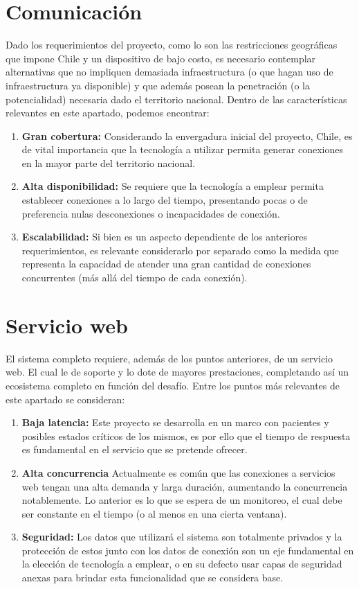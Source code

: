 \newpage
\section{Comunicación}
Dado los requerimientos del proyecto, como lo son las restricciones geográficas que impone Chile y un dispositivo de bajo costo, es necesario contemplar alternativas que no impliquen demasiada infraestructura (o que hagan uso de infraestructura ya disponible) y que además posean la penetración (o la potencialidad) necesaria dado el territorio nacional. Dentro de las características relevantes en este apartado, podemos encontrar:

\begin{enumerate}
	\item \textbf{Gran cobertura:}
	Considerando la envergadura inicial del proyecto, Chile, es de vital importancia que la tecnología a utilizar permita generar conexiones en la mayor parte del territorio nacional.
	\item \textbf{Alta disponibilidad:}
	Se requiere que la tecnología a emplear permita establecer conexiones a lo largo del tiempo, presentando pocas o de preferencia nulas desconexiones o incapacidades de conexión.
	\item \textbf{Escalabilidad:}
	Si bien es un aspecto dependiente de los anteriores requerimientos, es relevante considerarlo por separado como la medida que representa la capacidad de atender una gran cantidad de conexiones concurrentes (más allá del tiempo de cada conexión).
\end{enumerate}

\newpage
\section{Servicio web}
El sistema completo requiere, además de los puntos anteriores, de un servicio web. El cual le de soporte y lo dote de mayores prestaciones, completando así un ecosistema completo en función del desafío. Entre los puntos más relevantes de este apartado se consideran:

\begin{enumerate}
	\item \textbf{Baja latencia:}
	Este proyecto se desarrolla en un marco con pacientes y posibles estados críticos de los mismos, es por ello que el tiempo de respuesta es fundamental en el servicio que se pretende ofrecer.
	\item \textbf{Alta concurrencia}
	Actualmente es común que las conexiones a servicios web tengan una alta demanda y larga duración, aumentando la concurrencia notablemente. Lo anterior es lo que se espera de un monitoreo, el cual debe ser constante en el tiempo (o al menos en una cierta ventana).
	\item \textbf{Seguridad:}
	Los datos que utilizará el sistema son totalmente privados y la protección de estos junto con los datos de conexión son un eje fundamental en la elección de tecnología a emplear, o en su defecto usar capas de seguridad anexas para brindar esta funcionalidad que se considera base.
\end{enumerate}